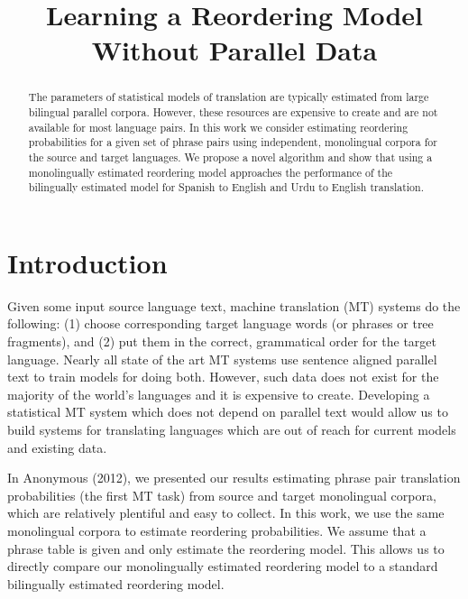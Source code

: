 \documentclass[11pt,letterpaper]{article}
\title{Learning a Reordering Model Without Parallel Data}
\date{}
\begin{document}
\maketitle

\begin{abstract}
The parameters of statistical models of translation are typically estimated from large bilingual parallel corpora.  However, these resources are expensive to create and are not available for most language pairs.  In this work we consider estimating reordering probabilities for a given set of phrase pairs using independent, monolingual corpora for the source and target languages. We propose a novel algorithm and show that using a monolingually estimated reordering model approaches the performance of the bilingually estimated model for Spanish to English and Urdu to English translation.
\end{abstract}

\section{Introduction}

Given some input source language text, machine translation (MT) systems do the following: (1) choose corresponding target language words (or phrases or tree fragments), and (2) put them in the correct, grammatical order for the target language. Nearly all state of the art MT systems use sentence aligned parallel text to train models for doing both. However, such data does not exist for the majority of the world's languages and it is expensive to create. Developing a statistical MT system which does not depend on parallel text would allow us to build systems for translating languages which are out of reach for current models and existing data. 

In Anonymous (2012), we presented our results estimating phrase pair translation probabilities (the first MT task) from source and target monolingual corpora, which are relatively plentiful and easy to collect. In this work, we use the same monolingual corpora to estimate reordering probabilities. We assume that a phrase table is given and only estimate the reordering model. This allows us to directly compare our monolingually estimated reordering model to a standard bilingually estimated reordering model.

\end{document}
